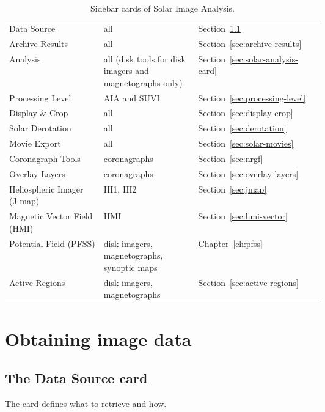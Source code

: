 \begin{table}[!htbp]
  \centering
  \caption{Sidebar cards of Solar Image Analysis.}
  \label{tab:solar-cards}
  \small
  \begin{tabularx}{\linewidth}{@{}P{0.3\linewidth}P{0.3\linewidth}L@{}}
    \toprule
     &  &  \\
    \midrule
    Data Source & all & Section~\ref{sec:data-source} \\
    Archive Results & all & Section~\ref{sec:archive-results} \\
    Analysis & all (disk tools for disk imagers and magnetographs only) & Section~\ref{sec:solar-analysis-card} \\
    Processing Level & AIA and SUVI & Section~\ref{sec:processing-level} \\
    Display \& Crop & all & Section~\ref{sec:display-crop} \\
    Solar Derotation & all & Section~\ref{sec:derotation} \\
    Movie Export & all & Section~\ref{sec:solar-movies} \\
    Coronagraph Tools & coronagraphs & Section~\ref{sec:nrgf} \\
    Overlay Layers & coronagraphs & Section~\ref{sec:overlay-layers} \\
    Heliospheric Imager (J-map) & HI1, HI2 & Section~\ref{sec:jmap} \\
    Magnetic Vector Field (HMI) & HMI & Section~\ref{sec:hmi-vector} \\
    Potential Field (PFSS) & disk imagers, magnetographs, synoptic maps & Chapter~\ref{ch:pfss} \\
    Active Regions & disk imagers, magnetographs & Section~\ref{sec:active-regions} \\
    \bottomrule
  \end{tabularx}
\end{table}

\section{Obtaining image data}

\subsection{The Data Source card}
\label{sec:data-source}

The  card defines what to retrieve and
how.

